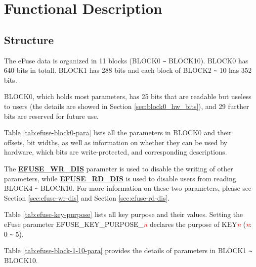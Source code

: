 \documentclass[main\_\_EN.tex]{subfiles}
\begin{document}
\section{Functional Description}

\subsection{Structure}

The eFuse data is organized in 11 blocks (BLOCK0 \verb+~+ BLOCK10). BLOCK0 has 640 bits in totall. BLOCK1 has 288 bits and each block of BLOCK2 \verb+~+ 10 has 352 bits.

BLOCK0, which holds most parameters, has 25 bits that are readable but useless to users (the details are showed in Section \ref{sec:block0_hw_bits}), and 29 further bits are reserved for future use.

Table \ref{tab:efuse-block0-para} lists all the parameters in BLOCK0 and their offsets, bit widths, as well as information on whether they can be used by hardware, which bits are write-protected, and corresponding descriptions.

The {\bfseries \hyperref[fielddesc:EFUSEWRDIS]{EFUSE\_WR\_DIS}} parameter is used to disable the writing of other parameters, while {\bfseries \hyperref[fielddesc:EFUSERDDIS]{EFUSE\_RD\_DIS}} is used to disable users from reading BLOCK4 \verb+~+ BLOCK10. For more information on these two parameters, please see Section \ref{sec:efuse-wr-dis} and Section \ref{sec:efuse-rd-dis}.


\clearpage
\begin{landscape}



\end{landscape}
\restoregeometry
\clearpage


Table \ref{tab:efuse-key-purpose} lists all key purpose and their values. Setting the eFuse parameter EFUSE\_KEY\_PURPOSE\_\textcolor{red}{\it{n}} declares the purpose of KEY\textcolor{red}{\it{n}} (\textcolor{red}{\it{n}}: 0 \verb+~+ 5).



Table  \ref{tab:efuse-block-1-10-para} provides the details of parameters in BLOCK1 \verb+~+ BLOCK10.

\clearpage
\begin{landscape}



\end{landscape}
\restoregeometry
\clearpage
\end{document}
